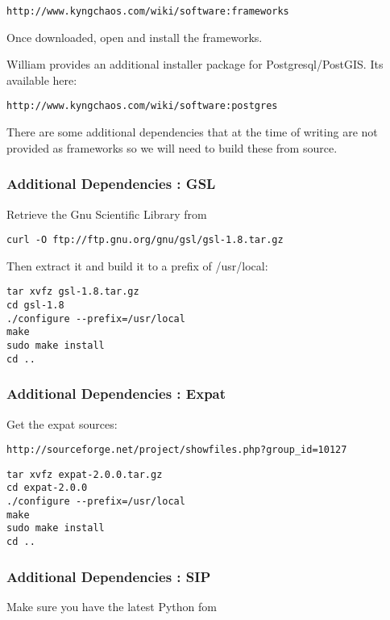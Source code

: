 \begin{verbatim}
http://www.kyngchaos.com/wiki/software:frameworks
\end{verbatim}

Once downloaded, open and install the frameworks.

William provides an additional installer package for Postgresql/PostGIS. Its
available here:

\begin{verbatim}
http://www.kyngchaos.com/wiki/software:postgres 
\end{verbatim}

There are some additional dependencies that at the time of writing are not
provided as frameworks so we will need to build these from source.

\subsubsection{Additional Dependencies : GSL}
Retrieve the Gnu Scientific Library from

\begin{verbatim}
curl -O ftp://ftp.gnu.org/gnu/gsl/gsl-1.8.tar.gz 
\end{verbatim}

Then extract it and build it to a prefix of /usr/local:

\begin{verbatim}
tar xvfz gsl-1.8.tar.gz 
cd gsl-1.8 
./configure --prefix=/usr/local 
make
sudo make install
cd ..  
\end{verbatim}

\subsubsection{Additional Dependencies : Expat}
Get the expat sources:

\begin{verbatim}
http://sourceforge.net/project/showfiles.php?group_id=10127 
\end{verbatim}

\begin{verbatim}
tar xvfz expat-2.0.0.tar.gz 
cd expat-2.0.0 
./configure --prefix=/usr/local
make 
sudo make install 
cd ..  
\end{verbatim}

\subsubsection{Additional Dependencies : SIP}
Make sure you have the latest Python fom 

